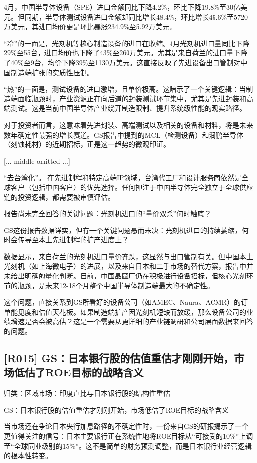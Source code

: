 \documentclass[11pt]{ctexart}
\begin{document}
4月，中国半导体设备（SPE）进口金额同比下降4.2\%，环比下降19.8\%至30亿美元。但同期，半导体测试设备进口金额却同比增长48.4\%，环比增长46.6\%至5720万美元，其进口均价更是环比暴涨234.9\%至5.92万美元。

“冷”的一面是，光刻机等核心制造设备的进口在收缩。4月光刻机进口量同比下降29\%至55台，进口均价也下降了43\%至260万美元。尤其是来自荷兰的进口量下降了40\%至9台，均价下降39\%至1130万美元。这直接反映了先进设备出口管制对中国制造端扩张的实质性压制。

“热”的一面是，测试设备的进口激增，且单价极高。这暗示了一个关键逻辑：当制造端面临瓶颈时，产业资源正在向后道的封装测试环节集中，尤其是先进封装和高端测试。这是当前中国半导体产业绕开制造限制、提升系统级性能的现实路径。

对于投资者而言，这意味着先进封装、高端测试以及相关的设备和材料，将是未来数年确定性最强的增长赛道。GS报告中提到的MCL（检测设备）和润鹏半导体（刻蚀耗材）的近期招标，正是这一趋势的微观印证。


[... middle omitted ...]

“去台湾化”。 在先进制程和特定高端IP领域，台湾代工厂和设计服务商依然是全球客户（包括中国客户）的优先选择。任何押注于中国半导体完全独立于全球供应链的投资逻辑，都需要被审慎评估。

报告尚未完全回答的关键问题：光刻机进口的“量价双杀”何时触底？

GS这份报告数据详实，但有一个关键问题悬而未决：光刻机进口的持续萎缩，何时会传导至本土先进制程的扩产进度上？

数据显示，来自荷兰的光刻机进口量价齐跌，这显然与出口管制有关。但中国本土光刻机（如上海微电子）的进展，以及来自日本和二手市场的替代方案，报告中并未给出明确的量化判断。目前，中国晶圆厂仍在积极进行设备招标，但核心光刻环节的瓶颈，是未来12-18个月整个中国半导体制造端最大的不确定性。

这个问题，直接关系到GS所看好的设备公司（如AMEC、Naura、ACMR）的订单能见度和估值天花板。如果制造端扩产因光刻机短缺而放缓，那么设备公司的业绩增速是否会被高估？这是一个需要从更详细的产业链调研和公司层面数据来回答的问题。

\subsection{[R015] GS：日本银行股的估值重估才刚刚开始，市场低估了ROE目标的战略含义}
{\small\color{refgray}归类：区域市场：印度卢比与日本银行股的结构性重估}

GS：日本银行股的估值重估才刚刚开始，市场低估了ROE目标的战略含义

当市场还在争论日本央行加息路径的不确定性时，一份来自GS的研报揭示了一个更值得关注的信号：日本主要银行正在系统性地将ROE目标从“可接受的10\%”上调至“全球同业级别的15\%”。这不是简单的财务预测调整，而是日本银行业经营逻辑的根本性转变。
\end{document}
